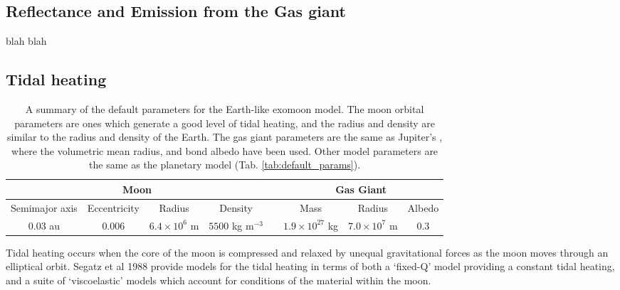 \documentclass[12pt, onecolumn]{revtex4-2}    %
\begin{document}
\subsection{Reflectance and Emission from the Gas giant}
%
blah blah 

\subsection{Tidal heating} \label{ssec:InvTidalHeating}
%
\begin{table*}
  \begin{tabular}{|c|c|c|c|c|c|c|c|}
    \hline
    \multicolumn{4}{|c|}{Moon} && \multicolumn{3}{c|}{Gas Giant} \\
    \hline
    Semimajor axis & Eccentricity & Radius & Density && Mass & Radius & Albedo \\
    \hline
    $0.03$ au & $0.006$ & $6.4\times 10^6$ m & $5500$ kg m$^{-3}$ && $1.9\times10^{27}$ kg & $7.0 \times 10^7$ m & 0.3 \\
    \hline
  \end{tabular}
  \caption{
    A summary of the default parameters for the Earth-like exomoon model.
    The moon orbital parameters are ones which generate a good level of tidal heating,
    and the radius and density are similar to the radius and density of the Earth.
    The gas giant parameters are the same as Jupiter's \cite{NASA_jupiter}, where the volumetric mean radius, and bond albedo have been used.
    Other model parameters are the same as the planetary model (Tab. \ref{tab:default_params}).
  }
  \label{tab:default_params_moon}
\end{table*}

Tidal heating occurs when the core of the moon is compressed and relaxed by unequal gravitational forces as the moon moves through an elliptical orbit. 
Segatz et al 1988 \cite{Segatz1988} provide models for the tidal heating in terms of both a `fixed-Q' model providing a constant tidal heating, and a suite of `viscoelastic' models which account for conditions of the material within the moon.
\end{document}
